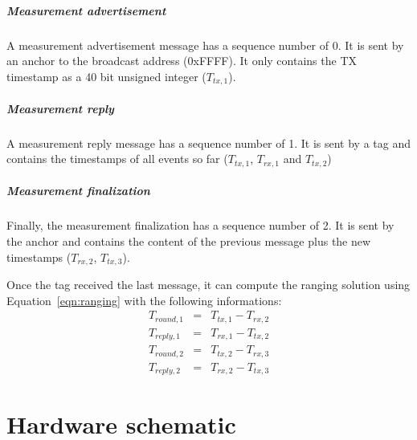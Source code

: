 \documentclass[a4paper]{scrreprt}
\begin{document}
\paragraph{Measurement advertisement}
A measurement advertisement message has a sequence number of 0.
It is sent by an anchor to the broadcast address (0xFFFF).
It only contains the TX timestamp as a 40 bit unsigned integer ($T_{tx,1}$).

\paragraph{Measurement reply}
A measurement reply message has a sequence number of 1.
It is sent by a tag and contains the timestamps of all events so far ($T_{tx,1}$, $T_{rx,1}$ and $T_{tx,2}$)

\paragraph{Measurement finalization}
Finally, the measurement finalization has a sequence number of 2.
It is sent by the anchor and contains the content of the previous message plus the new timestamps ($T_{rx,2}$, $T_{tx,3}$).

Once the tag received the last message, it can compute the ranging solution using Equation~\ref{eqn:ranging} with the following informations:
\begin{eqnarray*}
    T_{round,1} &=& T_{tx,1} - T_{rx,2} \\
    T_{reply,1} &=& T_{rx,1} - T_{tx,2} \\
    T_{round,2} &=& T_{tx,2} - T_{rx,3} \\
    T_{reply,2} &=& T_{rx,2} - T_{tx,3} 
\end{eqnarray*}

\appendix
\chapter{Hardware schematic}



\clearpage
\nocite{*} %


\end{document}
